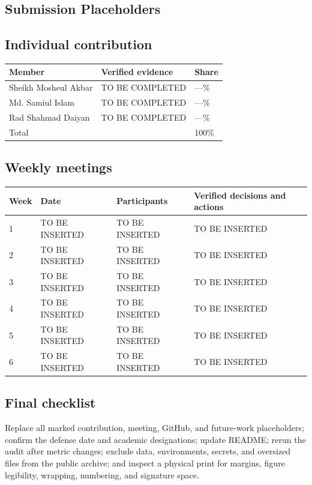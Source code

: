 \documentclass{iutbscthesis}
\begin{document}
\begin{appendices}
\chapter{Submission Placeholders}
\section{Individual contribution}
\begin{longtable}{p{}p{}p{}}\toprule Member&Verified evidence&Share\\\midrule\endhead
Sheikh Mosheul Akbar&TO BE COMPLETED&---\%\\Md. Samiul Islam&TO BE COMPLETED&---\%\\Rad Shahmad Daiyan&TO BE COMPLETED&---\%\\\midrule Total&&100\%\\\bottomrule\end{longtable}
\section{Weekly meetings}
\begin{longtable}{p{}p{}p{}p{}}\toprule Week&Date&Participants&Verified decisions and actions\\\midrule\endhead
1&TO BE INSERTED&TO BE INSERTED&TO BE INSERTED\\2&TO BE INSERTED&TO BE INSERTED&TO BE INSERTED\\3&TO BE INSERTED&TO BE INSERTED&TO BE INSERTED\\4&TO BE INSERTED&TO BE INSERTED&TO BE INSERTED\\5&TO BE INSERTED&TO BE INSERTED&TO BE INSERTED\\6&TO BE INSERTED&TO BE INSERTED&TO BE INSERTED\\\bottomrule\end{longtable}
\section{Final checklist}
Replace all marked contribution, meeting, GitHub, and future-work placeholders; confirm the defense date and academic designations; update README; rerun the audit after metric changes; exclude data, environments, secrets, and oversized files from the public archive; and inspect a physical print for margins, figure legibility, wrapping, numbering, and signature space.
\end{appendices}
\end{document}
